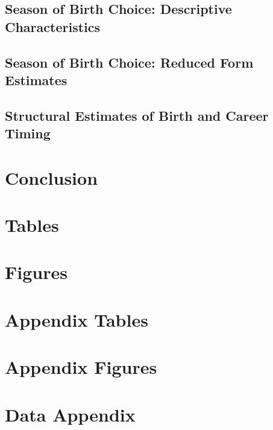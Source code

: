 \documentclass[a4paper, 11 pt]{article}
\theoremstyle{plain}
\begin{document}
\begin{spacing}{1.4}
\subsection{Season of Birth Choice: Descriptive Characteristics}

\subsection{Season of Birth Choice: Reduced Form Estimates}

\subsection{Structural Estimates of Birth and Career Timing}




\section{Conclusion}

\newpage





\newpage
\section*{Tables}


\newpage
\section*{Figures}


\clearpage
\appendix
\section{Appendix Tables}


\clearpage
\appendix
\section{Appendix Figures}



\section{Data Appendix}
\label{bqScn:datApp}

\end{spacing}
\end{document}
